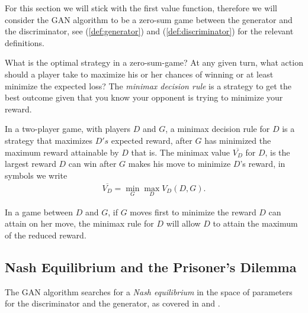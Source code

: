 \begin{remark}
  For this section we will stick with the first value function, therefore we
  will consider the GAN algorithm to be a zero-sum game between the generator
  and the discriminator, see (\ref{def:generator}) and (\ref{def:discriminator})
  for the relevant definitions.
\end{remark}

What is the optimal strategy in a zero-sum-game? At any given turn, what action
should a player take to maximize his or her chances of winning or at least
minimize the expected loss? The \textit{minimax decision rule} is a strategy to
get the best outcome given that you know your opponent is trying to minimize
your reward.

\begin{definition}
  \label{def:minimax}
  \label{def:minimax-value}
  In a two-player game, with players $D$ and $G$, a \textnormal{\sffamily
    minimax decision rule} for $D$ is a strategy that maximizes $D's$ expected
  reward, after $G$ has minimized the maximum reward attainable by $D$ that is.
  The \textnormal{\sffamily minimax value} $\overline{V_D}$ for $D$, is the
  largest reward $D$ can win after $G$ makes his move to minimize $D$'s reward,
  in symbols we write
  \begin{align}
    \overline{V_D} = \min_{G} \max_{D} V_D(D, {G}).
  \end{align}
\end{definition}

In a game between $D$ and $G$, if $G$ moves first to minimize the reward $D$ can
attain on her move, the minimax rule for $D$ will allow $D$ to attain the
maximum of the reduced reward.

\subsection{Nash Equilibrium and the Prisoner's Dilemma}
\label{sec:nash-dilemma}

The GAN algorithm searches for a \textit{Nash equilibrium} in the space of
parameters for the discriminator and the generator, as covered in
\cite{ref:goodfellow-2016} and \cite{ref:goodfellow-2017}.

